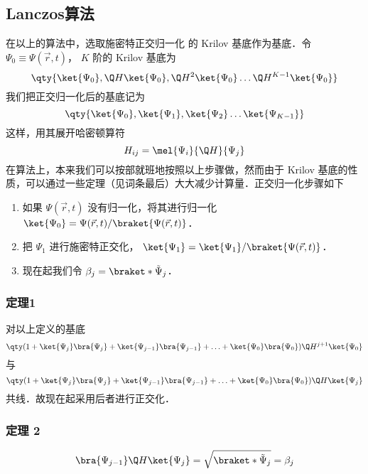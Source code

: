 \subsection{Lanczos算法}
在以上的算法中，选取施密特正交归一化 %
的 Krilov 基底作为基底．令 $\Psi_0 \equiv \Psi(\vec r, t)$，  $K$ 阶的 Krilov 基底为
 \begin{equation}
\qty{ \ket{\Psi_0}, \Q H \ket{\Psi_0}, \Q H^2 \ket{\Psi_0} \dots \Q H^{K-1} \ket{\Psi_0}}
\end{equation}
我们把正交归一化后的基底记为
\begin{equation}
\qty{ \ket{\Psi_0}, \ket{\Psi_1}, \ket{\Psi_2} \dots \ket{\Psi_{K-1}} }
\end{equation}
这样，用其展开哈密顿算符
\begin{equation}
H_{ij}=\mel{\Psi_i}{\Q H}{\Psi_j}
\end{equation}
在算法上，本来我们可以按部就班地按照以上步骤做，然而由于 Krilov 基底的性质，可以通过一些定理（见词条最后）大大减少计算量．正交归一化步骤如下

\begin{enumerate}
\item 如果 $\Psi(\vec r,t)$ 没有归一化，将其进行归一化 $\ket{\Psi_0}=\Psi(\vec r,t)/\braket{\Psi(\vec r,t)}$．
\item 把 $\Psi_1$ 进行施密特正交化， $\ket{\Psi_1}=\ket{\Psi_1}/\braket{\Psi(\vec r,t)}$．  %
\item 现在起我们令 $\beta_j = \braket*{\tilde\Psi_j}$． %
\end{enumerate}

\subsubsection{定理1}
对以上定义的基底
\begin{equation}
\qty(1 + \ket{\Psi_j} \bra{\Psi_j} + \ket{\Psi_{j - 1}} \bra{\Psi_{j - 1}} + \ldots + \ket{\Psi_0} \bra{\Psi_0}) \Q H^{j + 1} \ket{\Psi_0}
\end{equation}
与
\begin{equation}
\qty( 1 + \ket{\Psi_j}\bra{\Psi_j} + \ket{\Psi_{j - 1}}\bra{\Psi_{j - 1}} + \ldots + \ket{\Psi_0}\bra{\Psi_0}) \Q H \ket{\Psi_j}
\end{equation}
共线．故现在起采用后者进行正交化．

\subsubsection{定理 2}
\begin{equation}
\bra{\Psi_{j-1}} \Q H \ket{\Psi_j}  = \sqrt{\braket*{\tilde\Psi_j}} = \beta_j
\end{equation}

